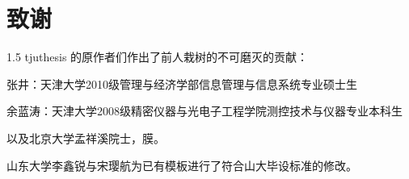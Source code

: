 
\titleformat{\chapter}{\centering\xiaoer\hei\bfseries}{\thechapter}{1em}{}
{} %
\chapter*{\xiaoer\hei\textbf{致\qquad\qquad 谢}}
\begin{spacing}{1.5}
\xiaosi\song
tjuthesis 的原作者们作出了前人栽树的不可磨灭的贡献：

张井：天津大学2010级管理与经济学部信息管理与信息系统专业硕士生

余蓝涛：天津大学2008级精密仪器与光电子工程学院测控技术与仪器专业本科生

以及北京大学孟祥溪院士，膜。

山东大学李鑫锐与宋璎航为已有模板进行了符合山大毕设标准的修改。
\end{spacing}

